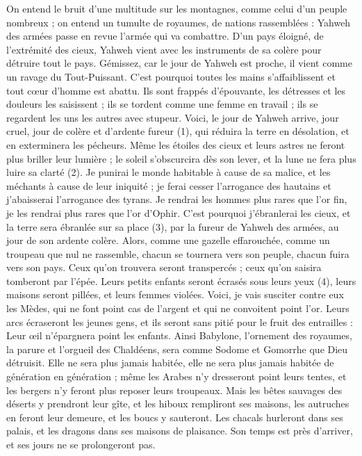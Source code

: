 \begin{multicols}{2}
On entend le bruit d’une multitude sur les montagnes, comme celui d’un peuple nombreux ; on entend un tumulte de royaumes, de nations rassemblées : Yahweh des armées passe en revue l'armée qui va combattre.
D’un pays éloigné, de l’extrémité des cieux, Yahweh vient avec les instruments de sa colère pour détruire tout le pays.
Gémissez, car le jour de Yahweh est proche, il vient comme un ravage du Tout-Puissant.
C'est pourquoi toutes les mains s’affaiblissent et tout cœur d'homme est abattu.
Ils sont frappés d’épouvante, les détresses et les douleurs les saisissent ; ils se tordent comme une femme en travail ; ils se regardent les uns les autres avec stupeur.
Voici, le jour de Yahweh arrive, jour cruel, jour de colère et d’ardente fureur (1), qui réduira la terre en désolation, et en exterminera les pécheurs.
Même les étoiles des cieux et leurs astres ne feront plus briller leur lumière ; le soleil s'obscurcira dès son lever, et la lune ne fera plus luire sa clarté (2).
Je punirai le monde habitable à cause de sa malice, et les méchants à cause de leur iniquité ; je ferai cesser l'arrogance des hautains et j'abaisserai l’arrogance des tyrans.
Je rendrai les hommes plus rares que l’or fin, je les rendrai plus rares que l’or d’Ophir.
C'est pourquoi j’ébranlerai les cieux, et la terre sera ébranlée sur sa place (3), par la fureur de Yahweh des armées, au jour de son ardente colère.
Alors, comme une gazelle effarouchée, comme un troupeau que nul ne rassemble, chacun se tournera vers son peuple, chacun fuira vers son pays.
Ceux qu’on trouvera seront transpercés ; ceux qu’on saisira tomberont par l’épée.
Leurs petits enfants seront écrasés sous leurs yeux (4), leurs maisons seront pillées, et leurs femmes violées.
Voici, je vais susciter contre eux les Mèdes, qui ne font point cas de l’argent et qui ne convoitent point l'or.
Leurs arcs écraseront les jeunes gens, et ils seront sans pitié pour le fruit des entrailles : Leur œil n'épargnera point les enfants.
Ainsi Babylone, l’ornement des royaumes, la parure et l'orgueil des Chaldéens, sera comme Sodome et Gomorrhe que Dieu détruisit.
Elle ne sera plus jamais habitée, elle ne sera plus jamais habitée de génération en génération ; même les Arabes n'y dresseront point leurs tentes, et les bergers n'y feront plus reposer leurs troupeaux.
Mais les bêtes sauvages des déserts y prendront leur gîte, et les hiboux rempliront ses maisons, les autruches en feront leur demeure, et les boucs y sauteront.
Les chacals hurleront dans ses palais, et les dragons dans ses maisons de plaisance. Son temps est près d’arriver, et ses jours ne se prolongeront pas.

\end{multicols}
